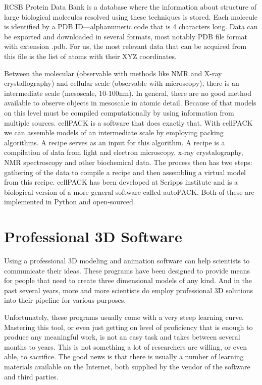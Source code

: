 \documentclass[
  digital, %
  table,   %
  nolof,     %
  nolot,     %
]{fithesis3}
\begin{document}
RCSB Protein Data Bank is a database where the information about structure of large biological molecules resolved using these techniques is stored. Each molecule is identified by a PDB ID—alphanumeric code that is 4 characters long. Data can be exported and downloaded in several formats, most notably PDB file format with extension .pdb. For us, the most relevant data that can be acquired from this file is the list of atoms with their XYZ coordinates.

Between the molecular (observable with methods like NMR and X-ray crystallography) and cellular scale (observable with microscopy), there is an intermediate scale (mesoscale, 10-100nm). In general, there are no good method available to observe objects in mesoscale in atomic detail. Because of that models on this level must be compiled computationally by using information from multiple sources. cellPACK\cite{cellPACK} is a software that does exactly that. With cellPACK we can assemble models of an intermediate scale by employing packing algorithms. A recipe serves as an input for this algorithm. A recipe is a compilation of data from light and electron microscopy, x-ray crystalography, NMR spectroscopy and other biochemical data. The process then has two steps: gathering of the data to compile a recipe and then assembling a virtual model from this recipe. cellPACK has been developed at Scripps institute and is a biological version of a more general software called autoPACK. Both of these are implemented in Python and open-sourced.

\section{Professional 3D Software}
Using a professional 3D modeling and animation software can help scientists to communicate their ideas. These programs have been designed to provide means for people that need to create three dimensional models of any kind. And in the past several years, more and more scientists do employ professional 3D solutions into their pipeline for various purposes.

Unfortunately, these programs usually come with a very steep learning curve. Mastering this tool, or even just getting on level of proficiency that is enough to produce any meaningful work, is not an easy task and takes between several months to years. This is not something a lot of researchers are willing, or even able, to sacrifice. The good news is that there is usually a number of learning materials available on the Internet, both supplied by the vendor of the software and third parties.
\end{document}
